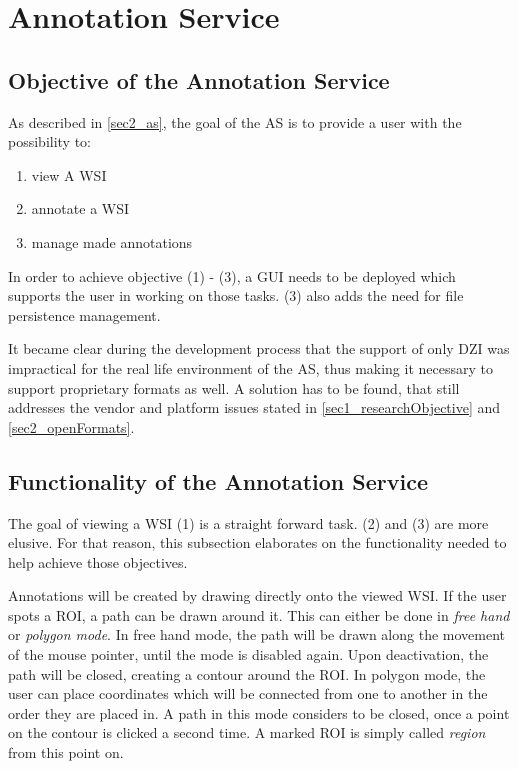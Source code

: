 \chapter{Annotation Service}

\section{Objective of the Annotation Service}
\label{sec4_objective}
As described in \ref{sec2_as}, the goal of the AS is to provide a user with the possibility to:
\begin{enumerate}[(1)]
	\item view A WSI
	\item annotate a WSI
	\item manage made annotations
\end{enumerate}

In order to achieve objective (1) - (3), a GUI needs to be deployed which supports the user in working on those tasks. (3) also adds the need for file persistence management.

It became clear during the development process that the support of only DZI was impractical for the real life environment of the AS, thus making it necessary to support proprietary formats as well. A solution has to be found, that still addresses the vendor and platform issues stated in \ref{sec1_researchObjective} and \ref{sec2_openFormats}.


\section{Functionality of the Annotation Service}
\label{sec4_functions}
The goal of viewing a WSI (1) is a straight forward task. (2) and (3) are more elusive. For that reason, this subsection elaborates on the functionality needed to help achieve those objectives.

Annotations will be created by drawing directly onto the viewed WSI. If the user spots a ROI, a path can be drawn around it. This can  either be done in \emph{free hand} or \emph{polygon mode}. In free hand mode, the path will be drawn along the movement of the mouse pointer, until the mode is disabled again. Upon deactivation, the path will be closed, creating a contour around the ROI. In polygon mode, the user can place coordinates which will be connected from one to another in the order they are placed in. A path in this mode considers to be closed, once a point on the contour is clicked a second time. A marked ROI is simply called \emph{region} from this point on.

